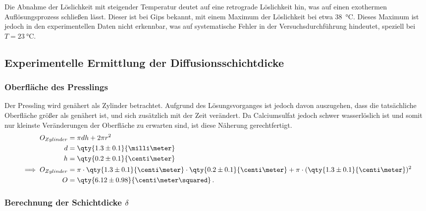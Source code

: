 Die Abnahme der Löslichkeit mit steigender Temperatur deutet auf eine retrograde Löslichkeit hin, was auf einen exothermen Auflösungsprozess schließen lässt.
Dieser ist bei Gips bekannt, mit einem Maximum der Löslichkeit bei etwa \qty{38}{\degreeCelsius}.\autocite{partridge1929solubility}
Dieses Maximum ist jedoch in den experimentellen Daten nicht erkennbar, was auf systematische Fehler in der Versuchsdurchführung hindeutet, speziell bei $T = \qty{23}{\degreeCelsius}$.

\subsection{Experimentelle Ermittlung der Diffusionsschichtdicke}

\subsubsection{Oberfläche des Presslings}
Der Pressling wird genähert als Zylinder betrachtet.
Aufgrund des Lösungsvorganges ist jedoch davon auszugehen, dass die tatsächliche Oberfläche größer als genähert ist, und sich zusätzlich mit der Zeit verändert.
Da Calciumsulfat jedoch schwer wasserlöslich ist und somit nur kleinste Veränderungen der Oberfläche zu erwarten sind, ist diese Näherung gerechtfertigt.
\begin{align}
    O_{Zylinder} &= \pi dh + 2\pi r^2 \label{eqn:oberfläche}\\
    d &= \qty{1.3 \pm 0.1}{\milli\meter} \nonumber \\
    h &= \qty{0.2 \pm 0.1}{\centi\meter} \nonumber \\
    \implies O_{Zylinder} &= \pi \cdot \qty{1.3 \pm 0.1}{\centi\meter} \cdot \qty{0.2 \pm 0.1}{\centi\meter} + \pi \cdot (\qty{1.3\pm 0.1}{\centi\meter})^2 \nonumber \\
    O &= \qty{6.12 \pm 0.98}{\centi\meter\squared}\, \text{.} \nonumber
\end{align}

\subsubsection{Berechnung der Schichtdicke $\delta$}

